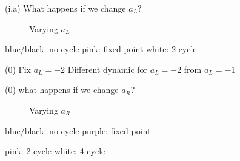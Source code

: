 \documentclass{beamer}
\newcounter{n}
\newcounter{f}
\begin{document}
\begin{frame}{(i.a) What happens if we change $a_L$?}
    \begin{figure}
        \centering
         \qquad
        \caption{Varying $a_L$}
    \end{figure}

    blue/black: no cycle
    \hspace*{\fill}
    pink: fixed point
    \hspace*{\fill}
    white: 2-cycle
\end{frame}

\begin{frame}{(0) Fix $a_L = -2$}
    Different dynamic for $a_L = -2$ from $a_L = -1$
\end{frame}

\begin{frame}{(0) what happens if we change $a_R$?}
    \begin{figure}
        \centering
         \qquad
        \caption{Varying $a_R$}
    \end{figure}
    
    \hspace*{\fill}
    blue/black: no cycle
    \hspace*{\fill}
    purple: fixed point
    \hspace*{\fill}

    \hspace*{\fill}
    pink: 2-cycle
    \hspace*{\fill}
    white: 4-cycle
    \hspace*{\fill}
\end{frame}
\end{document}
